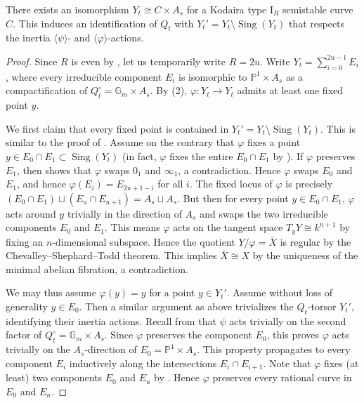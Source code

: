 \documentclass[reqno, letterpaper]{amsart}
\numberwithin{equation}{subsection}
\let\to\longrightarrow
\newcommand{\GG}{\mathbb{G}}
\newcommand{\PP}{\mathbb{P}}
\DeclareMathOperator{\Sing}{Sing}
\begin{document}
			\begin{lemma} \label{lem:semistable reduction theorem:varphi 2}
				There exists an isomorphism $Y_t \cong C \times A_s$ for a Kodaira type $\mathrm I_R$ semistable curve $C$. This induces an identification of $Q_t$ with $Y_t' = Y_t \setminus \Sing(Y_t)$ that respects the inertia $\langle \psi \rangle$- and $\langle \varphi \rangle$-actions.
			\end{lemma}
			\begin{proof}
				Since $R$ is even by , let us temporarily write $R = 2u$. Write $Y_t = \sum_{i=0}^{2u-1} E_i$, where every irreducible component $E_i$ is isomorphic to $\PP^1 \times A_s$ as a compactification of $Q_t^\circ = \GG_m \times A_s$. By (2), $\varphi : Y_t \to Y_t$ admits at least one fixed point $y$.
				
				\medskip
				
				We first claim that every fixed point is contained in $Y_t' = Y_t \setminus \Sing(Y_t)$. This is similar to the proof of . Assume on the contrary that $\varphi$ fixes a point $y \in E_0 \cap E_1 \subset \Sing(Y_t)$ (in fact, $\varphi$ fixes the entire $E_0 \cap E_1$ by ). If $\varphi$ preserves $E_1$, then  shows that $\varphi$ swaps $0_1$ and $\infty_1$, a contradiction. Hence $\varphi$ swaps $E_0$ and $E_1$, and hence $\varphi(E_i) = E_{2u+1-i}$ for all $i$. The fixed locus of $\varphi$ is precisely $(E_0 \cap E_1) \sqcup (E_u \cap E_{u+1}) = A_s \sqcup A_s$. But then for every point $y \in E_0 \cap E_1$, $\varphi$ acts around $y$ trivially in the direction of $A_s$ and swaps the two irreducible components $E_0$ and $E_1$. This means $\varphi$ acts on the tangent space $T_y Y \cong k^{n+1}$ by fixing an $n$-dimensional subspace. Hence the quotient $Y/\varphi = \bar X$ is regular by the Chevalley--Shephard--Todd theorem. This implies $\bar X \cong X$ by the uniqueness of the minimal abelian fibration, a contradiction.
				
				\medskip
				
				We may thus assume $\varphi(y) = y$ for a point $y \in Y_t'$. Assume without loss of generality $y \in E_0$. Then a similar argument as above trivializes the $Q_t$-torsor $Y_t'$, identifying their inertia actions. Recall from  that $\psi$ acts trivially on the second factor of $Q_t^\circ = \GG_m \times A_s$. Since $\varphi$ preserves the component $E_0$, this proves $\varphi$ acts trivially on the $A_s$-direction of $E_0 = \PP^1 \times A_s$. This property propagates to every component $E_i$ inductively along the intersections $E_i \cap E_{i+1}$. Note that $\varphi$ fixes (at least) two components $E_0$ and $E_u$ by . Hence $\varphi$ preserves every rational curve in $E_0$ and $E_u$.
				

\end{proof}
\end{document}

